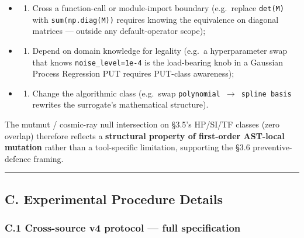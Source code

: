 \documentclass[review,12pt,authoryear]{elsarticle}
\providecommand{\tightlist}{\setlength{\itemsep}{0pt}\setlength{\parskip}{0pt}}
\begin{document}
\begin{itemize}
\tightlist
\item
  \begin{enumerate}
  \def\labelenumi{(\alph{enumi})}
  \tightlist
  \item
    Cross a function-call or module-import boundary (e.g.~replace
    \texttt{det(M)} with \texttt{sum(np.diag(M))} requires knowing the
    equivalence on diagonal matrices --- outside any default-operator
    scope);
  \end{enumerate}
\item
  \begin{enumerate}
  \def\labelenumi{(\alph{enumi})}
  \setcounter{enumi}{1}
  \tightlist
  \item
    Depend on domain knowledge for legality (e.g.~a hyperparameter swap
    that knows \texttt{noise\_level=1e-4} is the load-bearing knob in a
    Gaussian Process Regression PUT requires PUT-class awareness);
  \end{enumerate}
\item
  \begin{enumerate}
  \def\labelenumi{(\alph{enumi})}
  \setcounter{enumi}{2}
  \tightlist
  \item
    Change the algorithmic class (e.g.~swap
    \texttt{polynomial\ $\to$\ spline\ basis} rewrites the surrogate's
    mathematical structure).
  \end{enumerate}
\end{itemize}

The mutmut / cosmic-ray null intersection on §3.5's HP/SI/TF classes
(zero overlap) therefore reflects a \textbf{structural property of
first-order AST-local mutation} rather than a tool-specific limitation,
supporting the §3.6 preventive-defence framing.

\begin{center}\rule{0.5\linewidth}{0.5pt}\end{center}

\subsection{C. Experimental Procedure
Details}\label{c.-experimental-procedure-details}

\subsubsection{C.1 Cross-source v4 protocol --- full
specification}\label{c.1-cross-source-v4-protocol-full-specification}
\end{document}
